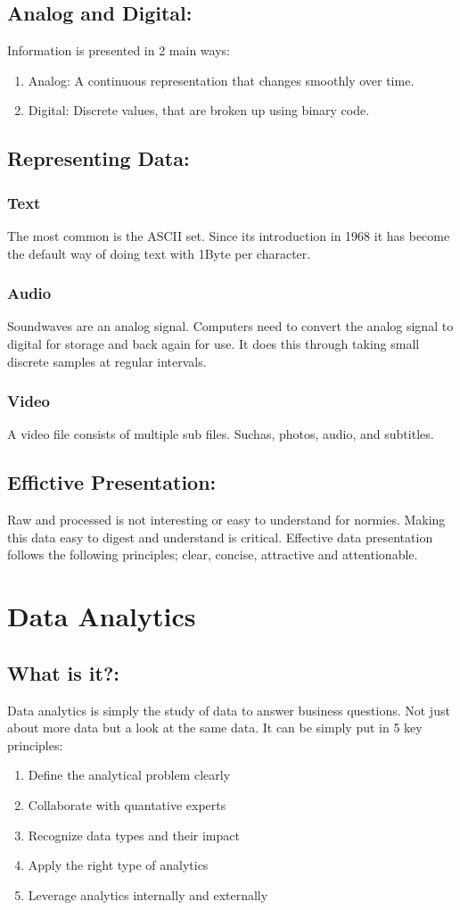 \documentclass[a5paper]{article}
\begin{document}
	\subsection{Analog and Digital:}
	Information is presented in 2 main ways:
	\begin{enumerate}
		\item Analog: A continuous representation that changes smoothly over time.
		\item Digital: Discrete values, that are broken up using binary code.
	\end{enumerate}
	\subsection{Representing Data:}
	\subsubsection{Text}
	The most common is the ASCII set. Since its introduction in 1968 it has become the default way of doing text with 1Byte per character. 
	\subsubsection{Audio}
	Soundwaves are an analog signal. Computers need to convert the analog signal to digital for storage and back again for use. It does this through taking small discrete samples at regular intervals.
	\subsubsection{Video}
	A video file consists of multiple sub files. Suchas, photos, audio, and subtitles.
	\subsection{Effictive Presentation:}
	Raw and processed is not interesting or easy to understand for normies. Making this data easy to digest and understand is critical. Effective data presentation follows the following principles; clear, concise, attractive and attentionable.

	\section{Data Analytics}
	\subsection{What is it?:}
	Data analytics is simply the study of data to answer business questions. Not just about more data but a look at the same data. It can be simply put in 5 key principles:
	\begin{enumerate}
		\item Define the analytical problem clearly
		\item Collaborate with quantative experts
		\item Recognize data types and their impact
		\item Apply the right type of analytics
		\item Leverage analytics internally and externally
	\end{enumerate}
\end{document}

